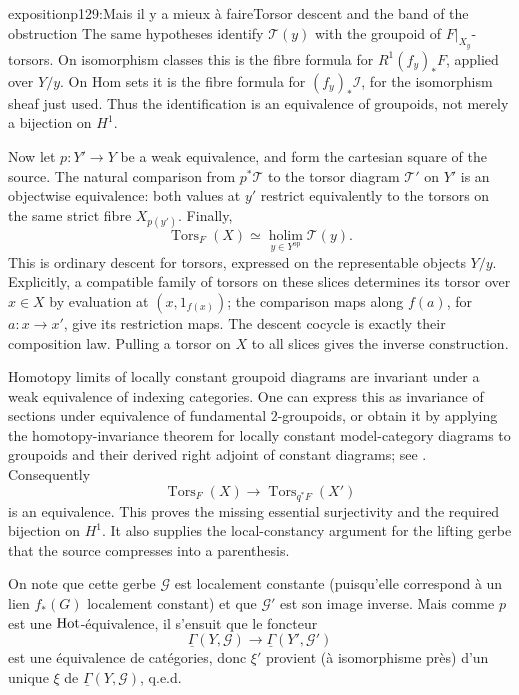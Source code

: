 \begin{dcomment}{exposition}{p129:Mais il y a mieux à faire}{Torsor descent and the band of the obstruction}
The same hypotheses identify \(\mathcal T(y)\) with the groupoid of \(F|_{X_y}\)-torsors. On isomorphism classes this is the fibre formula for \(R^1(f_y)_*F\), applied over \(Y/y\). On Hom sets it is the fibre formula for \((f_y)_*\mathcal I\), for the isomorphism sheaf just used. Thus the identification is an equivalence of groupoids, not merely a bijection on \(H^1\).

Now let \(p:Y'\longrightarrow Y\) be a weak equivalence, and form the cartesian square of the source. The natural comparison from \(p^*\mathcal T\) to the torsor diagram \(\mathcal T'\) on \(Y'\) is an objectwise equivalence: both values at \(y'\) restrict equivalently to the torsors on the same strict fibre \(X_{p(y')}\). Finally,
\[
 \operatorname{Tors}_F(X)
 \simeq \operatorname*{holim}_{y\in Y^{\mathrm{op}}}\mathcal T(y).
\]
This is ordinary descent for torsors, expressed on the representable objects \(Y/y\). Explicitly, a compatible family of torsors on these slices determines its torsor over \(x\in X\) by evaluation at \((x,1_{f(x)})\); the comparison maps along \(f(a)\), for \(a:x\longrightarrow x'\), give its restriction maps. The descent cocycle is exactly their composition law. Pulling a torsor on \(X\) to all slices gives the inverse construction.

Homotopy limits of locally constant groupoid diagrams are invariant under a weak equivalence of indexing categories. One can express this as invariance of sections under equivalence of fundamental \(2\)-groupoids, or obtain it by applying the homotopy-invariance theorem for locally constant model-category diagrams to groupoids and their derived right adjoint of constant diagrams; see \citet[Theorem 1.3]{Cisinski2009LocallyConstant}. Consequently
\[
 \operatorname{Tors}_F(X)\longrightarrow
 \operatorname{Tors}_{q^*F}(X')
\]
is an equivalence. This proves the missing essential surjectivity and the required bijection on \(H^1\). It also supplies the local-constancy argument for the lifting gerbe that the source compresses into a parenthesis.
\end{dcomment}




\noindent On note que cette gerbe $\mathcal{G}$ est localement constante (puisqu'elle correspond à un lien $f_*(G)$ localement constant) et que $\mathcal{G}'$ est son image inverse. Mais comme $p$ est une $\mathrm{Hot}$-équivalence, il s'ensuit que le foncteur
\[
\underline{\Gamma}(Y, \mathcal{G}) \longrightarrow \underline{\Gamma}(Y', \mathcal{G}')
\]
est une équivalence de catégories, donc $\xi'$ provient (à isomorphisme près) d'un unique $\xi$ de $\underline{\Gamma}(Y, \mathcal{G})$, q.e.d.

